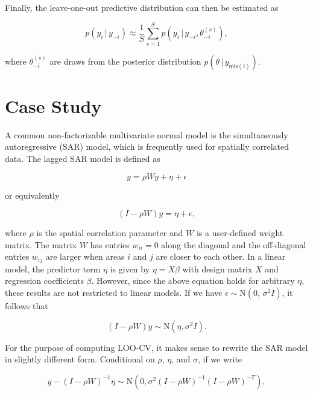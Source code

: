 \documentclass[english,,doc,floatsintext]{apa6}
\theoremstyle{definition}
\theoremstyle{definition}
\theoremstyle{definition}
\theoremstyle{remark}
\begin{document}
Finally, the leave-one-out predictive distribution can then be estimated
as

\begin{equation}
 p(y_i\,|\,y_{-i}) \approx \frac{1}{S} \sum_{s=1}^S p(y_i\,|\,y_{-i}, \theta_{-i}^{(s)}),
\end{equation}

where \(\theta_{-i}^{(s)}\) are draws from the posterior distribution
\(p(\theta\,|\,y_{\mathrm{mis}(i)})\).

\hypertarget{case-study}{%
\section{Case Study}\label{case-study}}

A common non-factorizable multivariate normal model is the
simultaneously autoregressive (SAR) model, which is frequently used for
spatially correlated data. The lagged SAR model is defined as

\begin{equation}
y = \rho Wy + \eta + \epsilon
\end{equation}

or equivalently

\begin{equation}
(I - \rho W)y = \eta + \epsilon,
\end{equation}

where \(\rho\) is the spatial correlation parameter and \(W\) is a
user-defined weight matrix. The matrix \(W\) has entries \(w_{ii} = 0\)
along the diagonal and the off-diagonal entries \(w_{ij}\) are larger
when areas \(i\) and \(j\) are closer to each other. In a linear model,
the predictor term \(\eta\) is given by \(\eta = X \beta\) with design
matrix \(X\) and regression coefficients \(\beta\). However, since the
above equation holds for arbitrary \(\eta\), these results are not
restricted to linear models. If we have
\(\epsilon \sim {\mathrm N}(0, \,\sigma^2 I)\), it follows that

\begin{equation}
(I - \rho W)y \sim {\mathrm N}(\eta, \sigma^2 I).
\end{equation}

For the purpose of computing LOO-CV, it makes sense to rewrite the SAR
model in slightly different form. Conditional on \(\rho\), \(\eta\), and
\(\sigma\), if we write

\begin{equation}
y-(I-\rho W)^{-1}\eta \sim {\mathrm N}(0, \sigma^2(I-\rho W)^{-1}(I-\rho W)^{-T}),
\end{equation}
\end{document}

